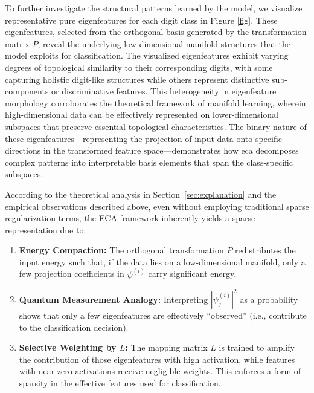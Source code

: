 \documentclass[lettersize,journal]{IEEEtran}
\begin{document}
To further investigate the structural patterns learned by the model, we visualize representative pure eigenfeatures for each digit class in Figure \ref{fig}. These eigenfeatures, selected from the orthogonal basis generated by the transformation matrix $P$, reveal the underlying low-dimensional manifold structures that the model exploits for classification. The visualized eigenfeatures exhibit varying degrees of topological similarity to their corresponding digits, with some capturing holistic digit-like structures while others represent distinctive sub-components or discriminative features. This heterogeneity in eigenfeature morphology corroborates the theoretical framework of manifold learning, wherein high-dimensional data can be effectively represented on lower-dimensional subspaces that preserve essential topological characteristics. The binary nature of these eigenfeatures—representing the projection of input data onto specific directions in the transformed feature space—demonstrates how \Gls{eca} decomposes complex patterns into interpretable basis elements that span the class-specific subspaces.

According to the theoretical analysis in Section~\ref{sec:explanation} and the empirical observations described above, even without employing traditional sparse regularization terms, the ECA framework inherently yields a sparse representation due to:
\begin{enumerate}
    \item \textbf{Energy Compaction:} The orthogonal transformation \(P\) redistributes the input energy such that, if the data lies on a low-dimensional manifold, only a few projection coefficients in \(\psi^{(i)}\) carry significant energy.
    \item \textbf{Quantum Measurement Analogy:} Interpreting \( |\psi_j^{(i)}|^2 \) as a probability shows that only a few eigenfeatures are effectively ``observed'' (i.e., contribute to the classification decision).
    \item \textbf{Selective Weighting by \(L\):} The mapping matrix \(L\) is trained to amplify the contribution of those eigenfeatures with high activation, while features with near-zero activations receive negligible weights. This enforces a form of sparsity in the effective features used for classification.
\end{enumerate}
\end{document}
